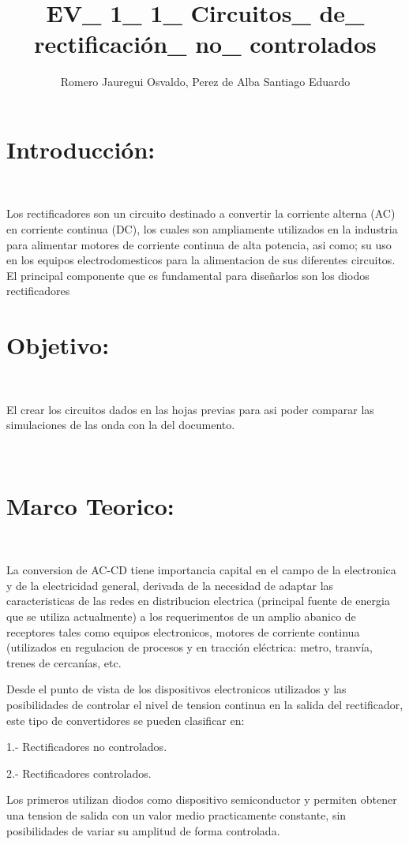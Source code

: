 \documentclass[12pt,letterpaper]{article}
\title{EV\_ 1\_ 1\_ Circuitos\_ de\_ rectificación\_ no\_ controlados }
\author{Romero Jauregui Osvaldo, Perez de Alba Santiago Eduardo}
\begin{document}
\maketitle

\section{Introducción:}
\

Los rectificadores son un circuito destinado a convertir la corriente alterna (AC) en corriente continua (DC), los cuales son ampliamente utilizados en la industria para alimentar motores de corriente continua de alta potencia, asi como; su uso en los equipos electrodomesticos para la alimentacion de sus diferentes circuitos. El principal componente que es fundamental para diseñarlos son los diodos rectificadores
\

\section{Objetivo:}
\

El crear los circuitos dados en las hojas previas para asi poder comparar las simulaciones de las onda con la del documento.

\

\section{Marco Teorico:}
\

La conversion de AC-CD tiene importancia capital en el campo de la electronica y de la electricidad general, derivada de la necesidad de adaptar las caracteristicas de las redes en distribucion electrica (principal fuente de energia que se utiliza actualmente) a los requerimentos de un amplio abanico de receptores tales como equipos electronicos, motores de corriente continua (utilizados en regulacion de procesos y en tracción  eléctrica: metro, tranvía, trenes de cercanías, etc.
\

Desde el punto de vista de los dispositivos electronicos utilizados y las posibilidades de controlar el nivel de tension continua en la salida del rectificador, este tipo de convertidores se pueden clasificar en:
\

1.- Rectificadores no controlados.
\

2.- Rectificadores controlados.
\

Los primeros utilizan diodos como dispositivo semiconductor y permiten obtener una tension de salida con un valor medio practicamente constante, sin posibilidades de variar su amplitud de forma controlada.
\
\end{document}
